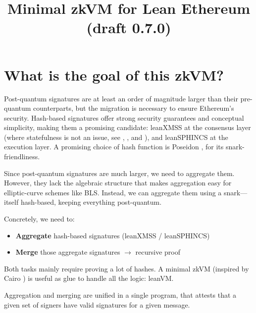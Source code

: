 \documentclass{article}
\title{Minimal zkVM for Lean Ethereum (draft 0.7.0)}
\author{}
\date{}
\theoremstyle{definition}
\begin{document}
\maketitle

\tableofcontents
\newpage

\section{What is the goal of this zkVM?}
Post-quantum signatures are at least an order of magnitude larger than their pre-quantum counterparts, but the migration is necessary to ensure Ethereum's security. Hash-based signatures offer strong security guarantees and conceptual simplicity, making them a promising candidate: leanXMSS at the consensus layer (where statefulness is not an issue, see \cite{ethereum_signatures}, \cite{top_hypercube}, and \cite{LeanSig}), and leanSPHINCS at the execution layer. A promising choice of hash function is Poseidon \cite{poseidon1}, for its snark-friendliness.

Since post-quantum signatures are much larger, we need to aggregate them. However, they lack the algebraic structure that makes aggregation easy for elliptic-curve schemes like BLS. Instead, we can aggregate them using a snark---itself hash-based, keeping everything post-quantum.

Concretely, we need to:
\begin{itemize}
     \item \textbf{Aggregate} hash-based signatures (leanXMSS / leanSPHINCS)
    \item \textbf{Merge} those aggregate signatures $\rightarrow$ recursive proof
\end{itemize}

Both tasks mainly require proving a lot of hashes. A minimal zkVM (inspired by Cairo \cite{cairo}) is useful as glue to handle all the logic: leanVM.

Aggregation and merging are unified in a single program, that attests that a given set of signers have valid signatures for a given message. 
\end{document}

